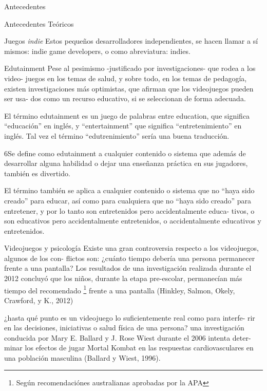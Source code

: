 \begin{section}{Antecedentes}
\begin{subsection}{Antecedentes Teóricos}
\begin{subsubsection}{Juegos \textit{indie}}
      Estos pequeños desarrolladores independientes, se hacen llamar a sí mismos: indie game developers, o como abreviatura: indies.
    \end{subsubsection}

    \begin{subsubsection}{Edutainment}
      Pese al pesimismo -justificado por investigaciones- que rodea a los video- juegos en los temas de salud, y sobre todo, en los temas de pedagogía, existen investigaciones más optimistas, que afirman que los videojuegos pueden ser usa- dos como un recurso educativo, si se seleccionan de forma adecuada. 

      El término edutainment es un juego de palabras entre education, que significa ``educación'' en inglés, y ``entertainment'' que significa ``entretenimiento'' en inglés. Tal vez el término ``edutrenimiento'' sería una buena traducción. 

      6Se define como edutainment a cualquier contenido o sistema que además de desarrollar alguna habilidad o dejar una enseñanza práctica en sus jugadores, también es divertido. 

      El término también se aplica a cualquier contenido o sistema que no ``haya sido creado'' para educar, así como para cualquiera que no ``haya sido creado'' para entretener, y por lo tanto son entretenidos pero accidentalmente educa- tivos, o son educativos pero accidentalmente entretenidos, o accidentalmente educativos y entretenidos.
    \end{subsubsection}

    \begin{subsubsection}{Videojuegos y psicología}
      Existe una gran controversia respecto a los videojuegos, algunos de los con- flictos son: ¿cuánto tiempo debería una persona permanecer frente a una pantalla? Los resultados de una investigación realizada durante el 2012 concluyó que los niños, durante la etapa pre-escolar, permanecían más tiempo del recomendado \footnote{Según recomendaciónes australianas aprobadas por la APA} frente a una pantalla (Hinkley, Salmon, Okely, Crawford, y K., 2012) 

      ¿hasta qué punto es un videojuego lo suficientemente real como para interfe- rir en las decisiones, iniciativas o salud física de una persona? una investigación conducida por Mary E. Ballard y J. Rose Wiest durante el 2006 intenta deter- minar los efectos de jugar Mortal Kombat en las respuestas cardiovasculares en una población masculina (Ballard y Wiest, 1996).
    \end{subsubsection}


\end{subsection}
\end{section}
